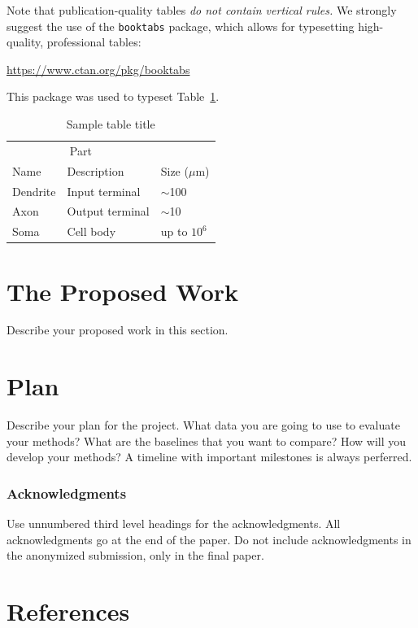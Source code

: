 \documentclass{article}
\begin{document}
Note that publication-quality tables \emph{do not contain vertical
  rules.} We strongly suggest the use of the \verb+booktabs+ package,
which allows for typesetting high-quality, professional tables:
\begin{center}
  \url{https://www.ctan.org/pkg/booktabs}
\end{center}
This package was used to typeset Table~\ref{sample-table}.

\begin{table}[t]
  \caption{Sample table title}
  \label{sample-table}
  \centering
  \begin{tabular}{lll}
    \toprule
    \multicolumn{2}{c}{Part}                   \\
    \cmidrule{1-2}
    Name     & Description     & Size ($\mu$m) \\
    \midrule
    Dendrite & Input terminal  & $\sim$100     \\
    Axon     & Output terminal & $\sim$10      \\
    Soma     & Cell body       & up to $10^6$  \\
    \bottomrule
  \end{tabular}
\end{table}

\section{The Proposed Work}
Describe your proposed work in this section. 



\section{Plan}
Describe your plan for the project. What data you are going to use to evaluate your methods? What are the baselines that you want to compare? How will you develop your methods?   A timeline with important milestones is always perferred. 


\subsubsection*{Acknowledgments}

Use unnumbered third level headings for the acknowledgments. All
acknowledgments go at the end of the paper. Do not include
acknowledgments in the anonymized submission, only in the final paper.

\section*{References}
\end{document}
